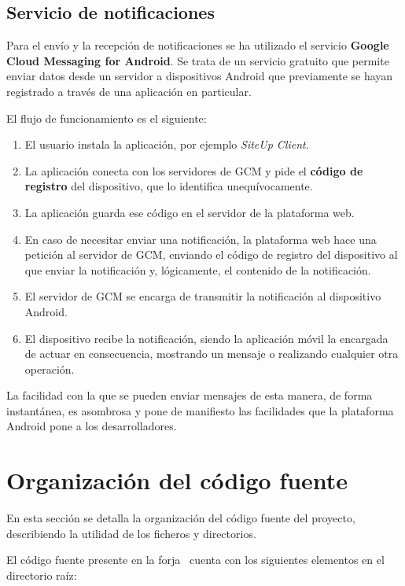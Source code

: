 \subsection{Servicio de notificaciones}

Para el envío y la recepción de notificaciones se ha utilizado el servicio
\textbf{Google Cloud Messaging for Android}. Se trata de un servicio gratuito
que permite enviar datos desde un servidor a dispositivos Android que
previamente se hayan registrado a través de una aplicación en particular.

El flujo de funcionamiento es el siguiente:
\begin{enumerate}
\item El usuario instala la aplicación, por ejemplo \textit{SiteUp Client}.
\item La aplicación conecta con los servidores de GCM y pide el \textbf{código
    de registro} del dispositivo, que lo identifica unequívocamente.
\item La aplicación guarda ese código en el servidor de la plataforma web.
\item En caso de necesitar enviar una notificación, la plataforma web hace una
  petición al servidor de GCM, enviando el código de registro del dispositivo al
  que enviar la notificación y, lógicamente, el contenido de la notificación.
\item El servidor de GCM se encarga de transmitir la notificación al dispositivo
  Android.
\item El dispositivo recibe la notificación, siendo la aplicación móvil la
  encargada de actuar en consecuencia, mostrando un mensaje o realizando
  cualquier otra operación.
\end{enumerate}

La facilidad con la que se pueden enviar mensajes de esta manera, de forma
instantánea, es asombrosa y pone de manifiesto las facilidades que la plataforma
Android pone a los desarrolladores.

\section{Organización del código fuente}

En esta sección se detalla la organización del código fuente del proyecto,
describiendo la utilidad de los ficheros y directorios.

El código fuente presente en la forja~\cite{forja} cuenta con los siguientes
elementos en el directorio raíz:


